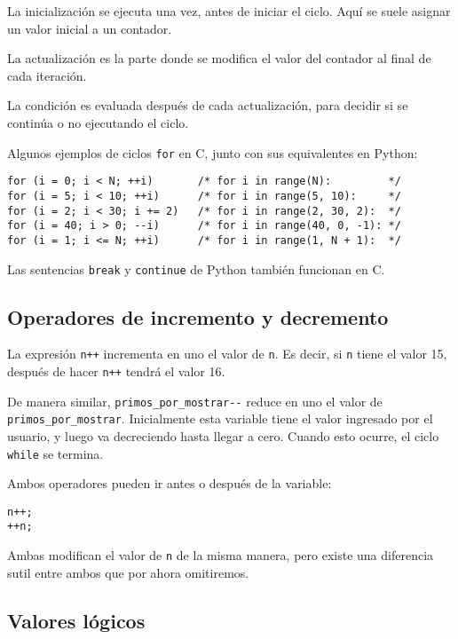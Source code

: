 La inicialización se ejecuta una vez, antes de iniciar el ciclo. Aquí se
suele asignar un valor inicial a un contador.

La actualización es la parte donde se modifica el valor del contador al
final de cada iteración.

La condición es evaluada después de cada actualización, para decidir si
se continúa o no ejecutando el ciclo.

Algunos ejemplos de ciclos \lstinline!for! en C, junto con sus
equivalentes en Python:

\begin{lstlisting}
for (i = 0; i < N; ++i)       /* for i in range(N):         */
for (i = 5; i < 10; ++i)      /* for i in range(5, 10):     */
for (i = 2; i < 30; i += 2)   /* for i in range(2, 30, 2):  */
for (i = 40; i > 0; --i)      /* for i in range(40, 0, -1): */
for (i = 1; i <= N; ++i)      /* for i in range(1, N + 1):  */
\end{lstlisting}

Las sentencias \lstinline!break! y \lstinline!continue! de Python
también funcionan en C.

\subsection{Operadores de incremento y decremento}

La expresión \lstinline!n++! incrementa en uno el valor de
\lstinline!n!. Es decir, si \lstinline!n! tiene el valor 15, después de
hacer \lstinline!n++! tendrá el valor 16.

De manera similar, \lstinline!primos_por_mostrar--! reduce en uno el
valor de \lstinline!primos_por_mostrar!. Inicialmente esta variable
tiene el valor ingresado por el usuario, y luego va decreciendo hasta
llegar a cero. Cuando esto ocurre, el ciclo \lstinline!while! se
termina.

Ambos operadores pueden ir antes o después de la variable:

\begin{lstlisting}
n++;
++n;
\end{lstlisting}

Ambas modifican el valor de \lstinline!n! de la misma manera, pero
existe una diferencia sutil entre ambos que por ahora omitiremos.

\subsection{Valores lógicos}

